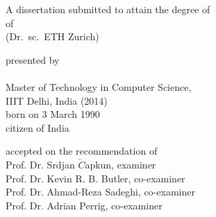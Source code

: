 \begin{titlepage}
    \begin{center}
        \large
        \begingroup
        \endgroup

        \hfill

        \vfill

        \begingroup
            \spacedallcaps{\myTitle}
        \endgroup

        \vfill

        \begingroup
            A dissertation submitted to attain the degree of\\
            \vspace{0.5em}
            of
             \\
            (Dr.\ sc.\ ETH Zurich)
        \endgroup

        \vfill

        \begingroup
            presented by\\
            \vspace{0.5em}
            \spacedallcaps{\myName}\\\vspace{0.5em}
            Master of Technology in Computer Science,\\ IIIT Delhi, India (2014)\\
            \vspace{0.5em}
            born on 3 March 1990\\
            citizen of India
        \endgroup

        \vfill

        \begingroup
            accepted on the recommendation of\\
            \vspace{0.5em}
            Prof. Dr. Srdjan $\check{C}$apkun, examiner\\
			Prof. Dr. Kevin R. B. Butler, co-examiner\\
			Prof. Dr. Ahmad-Reza Sadeghi, co-examiner\\
			Prof. Dr. Adrian Perrig, co-examiner
        \endgroup

        \vfill

        \myTime%

        \vfill
    \end{center}
\end{titlepage}
